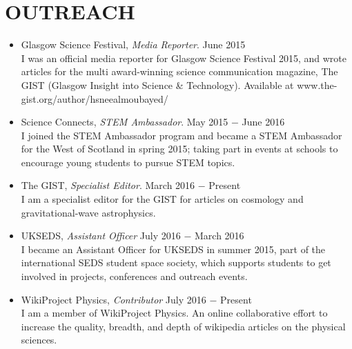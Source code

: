 
\section{OUTREACH}
\begin{itemize}
\item Glasgow Science Festival, {\sl Media Reporter}. \hfill June 2015 \\
I was an official media reporter for Glasgow Science Festival 2015, and wrote articles for the multi award-winning science communication magazine, The GIST (Glasgow Insight into Science \& Technology). Available at www.the-gist.org/author/hsneealmoubayed/ \\

\item Science Connects, {\sl STEM Ambassador}. \hfill May 2015 $-$ June 2016 \\
I joined the STEM Ambassador program and became a STEM Ambassador for the West of Scotland in spring 2015; taking part in events at schools to encourage young students to pursue STEM topics. \\

\item The GIST, {\sl Specialist Editor}. \hfill March 2016 $-$ Present \\
I am a specialist editor for the GIST for articles on cosmology and gravitational-wave astrophysics. \\

\item UKSEDS, {\sl Assistant Officer} \hfill July 2016 $-$ March 2016\\
I became an Assistant Officer for UKSEDS in summer 2015, part of the international SEDS student space society, which supports students to get involved in projects, conferences and outreach events. \\

\item WikiProject Physics, {\sl Contributor} \hfill July 2016 $-$ Present\\
I am a member of WikiProject Physics. An online collaborative effort to increase the quality, breadth, and depth of wikipedia articles on the physical sciences. \\

\end{itemize}

